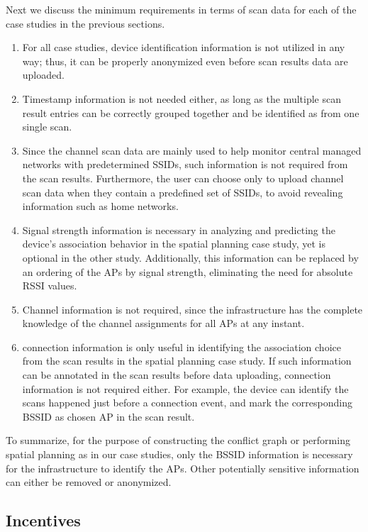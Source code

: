Next we discuss the minimum requirements in terms of scan data for each of the
case studies in the previous sections.
\begin{enumerate}
  \item For all case studies, device identification information is not
    utilized in any way; thus, it can be properly anonymized even before scan
    results data are uploaded.
  \item Timestamp information is not needed either, as long as the multiple
    scan result entries can be correctly grouped together and be identified as
    from one single scan.
  \item Since the channel scan data are mainly used to help monitor central
    managed networks with predetermined SSIDs, such information is not required
    from the scan results. Furthermore, the user can choose only to upload
    channel scan data when they contain a predefined set of SSIDs, to avoid
    revealing information such as home \wifi{} networks. 
  \item Signal strength information is necessary in analyzing and predicting
    the device's association behavior in the spatial planning case study, yet
    is optional in the other study. Additionally, this information can be
    replaced by an ordering of the APs by signal strength, eliminating the need
    for absolute RSSI values.
  \item Channel information is not required, since the infrastructure has the
    complete knowledge of the channel assignments for all APs at any instant.
  \item \wifi{} connection information is only useful in identifying the
    association choice from the scan results in the spatial planning case
    study. If such information can be annotated in the scan results before data
    uploading, \wifi{} connection information is not required either. For
    example, the device can identify the scans happened just before a \wifi{}
    connection event, and mark the corresponding BSSID as chosen AP in the scan
    result.
\end{enumerate}

To summarize, for the purpose of constructing the conflict graph or performing
spatial planning as in our case studies, only the BSSID information is necessary
for the infrastructure to identify the APs. Other potentially sensitive
information can either be removed or anonymized.

\subsection{Incentives}
\label{subsec:incentive}

